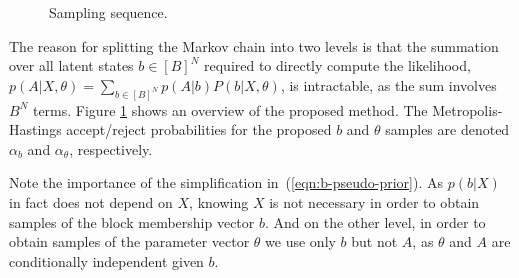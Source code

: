 \begin{figure}[!h]
	\centering

	\caption{Sampling sequence.}
	\label{fig:samp-sequence}
\end{figure}

The reason for splitting the Markov chain into two levels is that the summation over all latent states $b \in [B]^N$ required to directly compute the likelihood, $p(A| X, \theta) = \sum_{b \in [B]^N} p(A | b) P(b | X, \theta)$,
is intractable, as the sum involves $B^N$ terms. 
Figure \ref{fig:samp-sequence} shows an overview of the proposed method. 
The Metropolis-Hastings accept/reject probabilities 
for the proposed $b$ and $\theta$ samples are denoted $\alpha_b$ and
$\alpha_\theta$, respectively.

Note the importance of the simplification in~(\ref{eqn:b-pseudo-prior}). 
As $p(b| X)$ in fact does not depend on $X$, 
knowing $X$ is not necessary in order to obtain samples
of the block membership vector $b$.
And on the other level, in order to obtain 
samples of the parameter vector $\theta$
we use only $b$ but not $A$, as $\theta$ and $A$ are
conditionally independent given $b$. 

